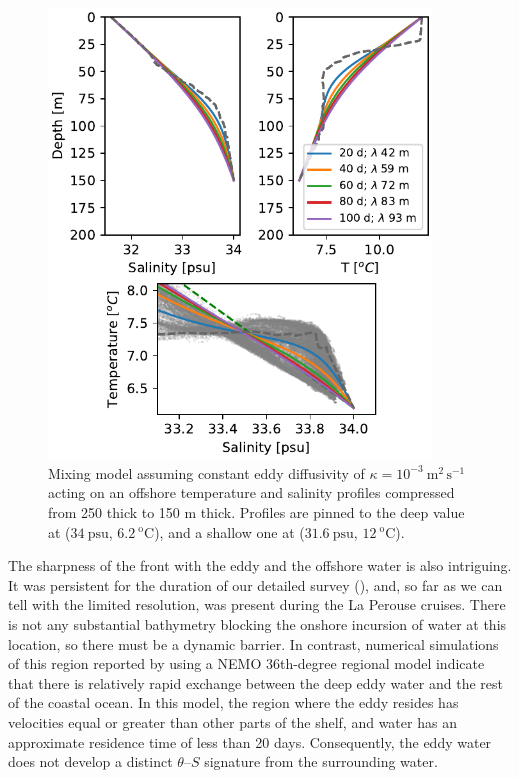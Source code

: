 \documentclass[draft]{agujournal2019}
\begin{document}
\begin{figure}[htbp]
  \begin{center}
    \includegraphics[width=4in]{TSExercise}
    \caption{Mixing model assuming constant eddy diffusivity of $\kappa = 10^{-3}\ \mathrm{m^2\,s^{-1}}$ acting on an offshore temperature and salinity profiles compressed from 250 thick to 150 m thick.  Profiles are pinned to the deep value at ($34\ \mathrm{psu}$, $6.2\ \mathrm{^oC}$), and a shallow one at ($31.6\ \mathrm{psu}$, $12\ \mathrm{^oC}$).
      \label{fig:TSExercise} }
  \end{center}
\end{figure}

The sharpness of the front with the eddy and the offshore water is also intriguing.  It was persistent for the duration of our detailed survey (), and, so far as we can tell with the limited resolution, was present during the La Perouse cruises. There is not any substantial bathymetry blocking the onshore incursion of water at this location, so there must be a dynamic barrier. In contrast, numerical simulations of this region reported by \cite{sahuetal22} using a NEMO 36th-degree regional model  indicate that there is relatively rapid exchange between the deep eddy water and the rest of the coastal ocean.  In this model, the region where the eddy resides has velocities equal or greater than other parts of the shelf, and water has an approximate residence time of less than 20 days.  Consequently, the eddy water does not develop a distinct $\theta$--$S$ signature from the surrounding water.
\end{document}
